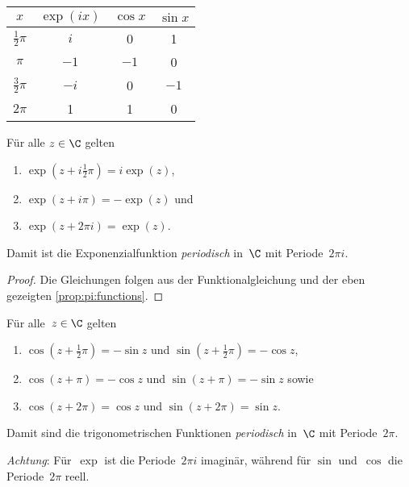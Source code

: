 \documentclass[a4paper]{article}
\begin{document}
\begin{center}
    \begin{tabular}{@{}c@{\colsep}ccc@{}}\toprule
        $x$              & $\exp(ix)$ & $\cos x$ & $\sin x$ \\\midrule
        $\frac{1}{2}\pi$ & $i$        & 0        & 1        \\
        $\pi$            & $-1$       & $-1$     & 0        \\
        $\frac{3}{2}\pi$ & $-i$       & 0        & $-1$     \\
        $2\pi$           & 1          & 1        & 0        \\\bottomrule
    \end{tabular}
\end{center}

\begin{theorem}
    Für alle $z \in \C$ gelten
    \begin{enumerate}
        \item $\exp(z+i\frac{1}{2}\pi) = i\exp(z)$,
        \item $\exp(z+i\pi) = -\exp(z)$ und
        \item $\exp(z+2\pi i) = \exp(z)$.
    \end{enumerate}
    Damit ist die Exponenzialfunktion \emph{periodisch} in~$\C$ mit Periode~$2\pi i$.
\end{theorem}

\begin{proof}
    Die Gleichungen folgen aus der Funktionalgleichung und der eben gezeigten \cref{prop:pi:functions}.
\end{proof}

\begin{corollary}[Phasenverschiebung]
    Für alle~$z \in \C$ gelten
    \begin{enumerate}
        \item $\cos(z+\frac{1}{2}\pi) = -\sin z$ und $\sin(z+\frac{1}{2}\pi) = -\cos z$,\label{cor:trig:phase:1}
        \item $\cos(z+\pi) = -\cos z$ und $\sin(z+\pi) = -\sin z$ sowie\label{cor:trig:phase:2}
        \item $\cos(z+2\pi) = \cos z$ und $\sin(z+2\pi) = \sin z$.
    \end{enumerate}
    Damit sind die trigonometrischen Funktionen \emph{periodisch} in~$\C$ mit Periode~$2\pi$.
\end{corollary}

\emph{Achtung}: Für~$\exp$ ist die Periode~$2\pi i$ imaginär, während für $\sin$ und~$\cos$ die Periode~$2\pi$ reell.
\end{document}
